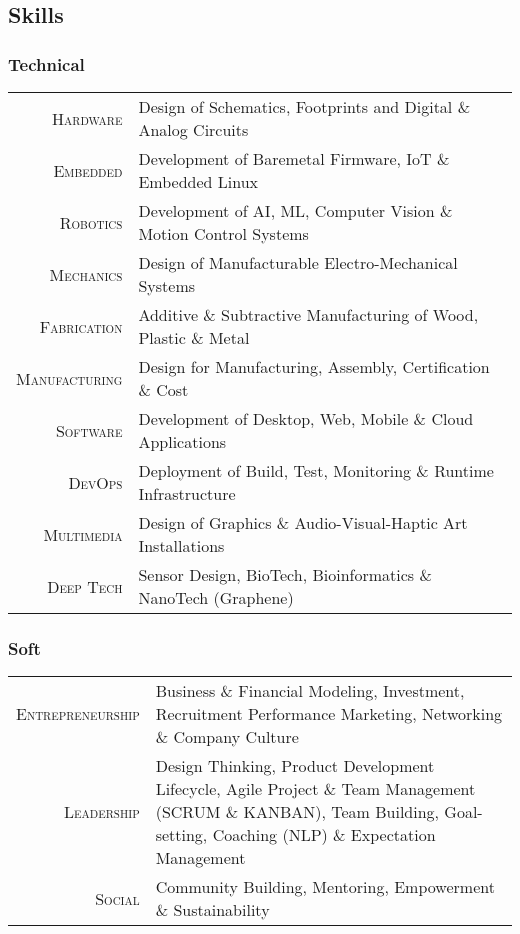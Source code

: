 \subsection{Skills}
\subsubsection{Technical}
\begin{longtable}
		{r|p{13cm}}
		\textsc{Hardware} & Design of Schematics, Footprints and Digital \& Analog Circuits\\
		\textsc{Embedded} & Development of Baremetal Firmware, IoT \& Embedded Linux\\
		\textsc{Robotics} & Development of AI, ML, Computer Vision \& Motion Control Systems\\
		\textsc{Mechanics} & Design of Manufacturable Electro-Mechanical Systems\\
		\textsc{Fabrication} & Additive \& Subtractive Manufacturing of Wood, Plastic \& Metal\\
		\textsc{Manufacturing} & Design for Manufacturing, Assembly, Certification \& Cost\\
		\textsc{Software} & Development of Desktop, Web, Mobile \& Cloud Applications\\
		\textsc{DevOps} & Deployment of Build, Test, Monitoring \& Runtime Infrastructure\\
		\textsc{Multimedia} & Design of Graphics \& Audio-Visual-Haptic Art Installations\\
		\textsc{Deep Tech} & Sensor Design, BioTech, Bioinformatics \& NanoTech (Graphene)\\
\end{longtable}

\subsubsection{Soft}
\begin{longtable}
		{r|p{13cm}}
		\textsc{Entrepreneurship} & Business \& Financial Modeling, Investment, Recruitment \newline Performance Marketing, Networking \& Company Culture\\
		\textsc{Leadership} & Design Thinking, Product Development Lifecycle, Agile Project \newline \& Team Management (SCRUM \& KANBAN), Team Building, \newline Goal-setting, Coaching (NLP) \& Expectation Management\\
		\textsc{Social} & Community Building, Mentoring, Empowerment \& Sustainability\\
\end{longtable}
